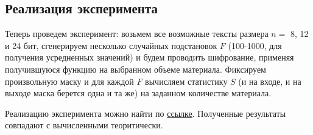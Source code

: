 \documentclass[utf8x, 14pt]{G7-32} %
\begin{document}
\subsection{Реализация эксперимента}

Теперь проведем эксперимент: возьмем все возможные тексты размера $n = $ 8, 12 и 24 бит, сгенерируем несколько случайных подстановок $F$ (100-1000, для получения усредненных значений) и будем проводить шифрование, применяя получившуюся функцию на выбранном объеме материала. Фиксируем произвольную маску и для каждой $F$ вычисляем статистику $S$ (и на входе, и на выходе маска берется одна и та же) на заданном количестве материала. 

Реализацию эксперимента можно найти по \href{https://github.com/jerrydie/thesis}{ссылке}. Полученные результаты совпадают с вычисленными теоритически.




\end{document}
